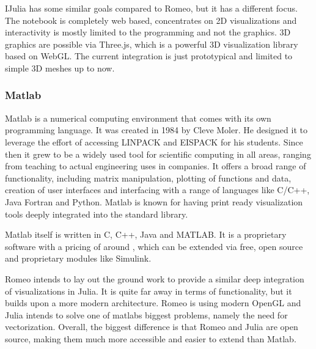 IJulia has some similar goals compared to Romeo, but it has a different focus.
The notebook is completely web based, concentrates on 2D visualizations and interactivity is mostly limited to the programming and not the graphics.
3D graphics are possible via Three.js, which is a powerful 3D visualization library based on WebGL.
The current integration is just prototypical and limited to simple 3D meshes up to now.


\subsubsection{Matlab}

\ac{Matlab} is a numerical computing environment that comes with its own programming language.
It was created in 1984 by Cleve Moler. He designed it to leverage the effort of accessing LINPACK and EISPACK for his students.
Since then it grew to be a widely used tool for scientific computing in all areas, ranging from teaching to actual engineering uses in companies.
It offers a broad range of functionality, including matrix manipulation, plotting of functions and data, creation of user interfaces and interfacing with a range of languages like C/C++, Java Fortran and Python. 
Matlab is known for having print ready visualization tools deeply integrated into the standard library.

\ac{Matlab} itself is written in C, C++, Java and MATLAB.
It is a proprietary software with a pricing of around \cite{MatlabPricing}, which can be extended via free, open source and proprietary modules like Simulink.

Romeo intends to lay out the ground work to provide a similar deep integration of visualizations in Julia. 
It is quite far away in terms of functionality, but it builds upon a more modern architecture.
Romeo is using modern OpenGL and Julia intends to solve one of matlabs biggest problems, namely the need for vectorization.
Overall, the biggest difference is that Romeo and Julia are open source, making them much more accessible and easier to extend than Matlab.


